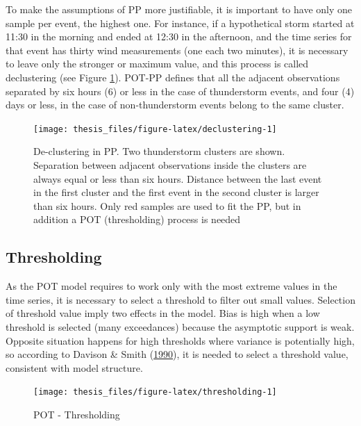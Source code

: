 \documentclass[12pt,oneside]{reedthesis}
\begin{document}
To make the assumptions of PP more justifiable, it is important to have only one sample per event, the highest one. For instance, if a hypothetical storm started at 11:30 in the morning and ended at 12:30 in the afternoon, and the time series for that event has thirty wind measurements (one each two minutes), it is necessary to leave only the stronger or maximum value, and this process is called declustering (see Figure \ref{fig:declustering}). POT-PP defines that all the adjacent observations separated by six hours (6) or less in the case of thunderstorm events, and four (4) days or less, in the case of non-thunderstorm events belong to the same cluster.

\footnotesize
\begin{figure}

{\centering \texttt{[image: thesis\_files/figure-latex/declustering-1]} 

}

\caption{De-clustering in PP. Two thunderstorm clusters are shown. Separation between adjacent observations inside the clusters are always equal or less than six hours. Distance between the last event in the first cluster and the first event in the second cluster is larger than six hours. Only red samples are used to fit the PP, but in addition a POT (thresholding) process is needed}\label{fig:declustering}
\end{figure}
\normalsize

\hypertarget{thresholding}{%
\subsection{Thresholding}\label{thresholding}}

As the POT model requires to work only with the most extreme values in the time series, it is necessary to select a threshold to filter out small values. Selection of threshold value imply two effects in the model. Bias is high when a low threshold is selected (many exceedances) because the asymptotic support is weak. Opposite situation happens for high thresholds where variance is potentially high, so according to Davison \& Smith (\protect\hyperlink{ref-Davison1990}{1990}), it is needed to select a threshold value, consistent with model structure.

\footnotesize
\begin{figure}

{\centering \texttt{[image: thesis\_files/figure-latex/thresholding-1]} 

}

\caption{POT - Thresholding}\label{fig:thresholding}
\end{figure}
\normalsize
\end{document}
